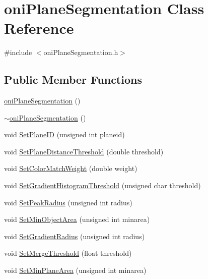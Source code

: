 \hypertarget{classoni_plane_segmentation}{\section{oni\-Plane\-Segmentation Class Reference}
\label{classoni_plane_segmentation}
}


{\ttfamily \#include $<$oni\-Plane\-Segmentation.\-h$>$}

\subsection*{Public Member Functions}
\begin{DoxyCompactItemize}
\item 
\hyperlink{classoni_plane_segmentation_a4ace0243ee63fd42feeb32e67082467c}{oni\-Plane\-Segmentation} ()
\item 
\hyperlink{classoni_plane_segmentation_ad240c925a9d7548b0541a937a3d8323d}{$\sim$oni\-Plane\-Segmentation} ()
\item 
void \hyperlink{classoni_plane_segmentation_aebbb7db20ffabe9ff6af48c428209990}{Set\-Plane\-I\-D} (unsigned int planeid)
\item 
void \hyperlink{classoni_plane_segmentation_ab80b11a24ce72391f854de5c0d79ca43}{Set\-Plane\-Distance\-Threshold} (double threshold)
\item 
void \hyperlink{classoni_plane_segmentation_acbdfa1fd8645deb451fa0474afdc0bac}{Set\-Color\-Match\-Weight} (double weight)
\item 
void \hyperlink{classoni_plane_segmentation_ace19b996d053f44fe8f150972e3981d6}{Set\-Gradient\-Histogram\-Threshold} (unsigned char threshold)
\item 
void \hyperlink{classoni_plane_segmentation_a989b273d62d7dc593c734169792654eb}{Set\-Peak\-Radius} (unsigned int radius)
\item 
void \hyperlink{classoni_plane_segmentation_a8c7df0530ad97691de995d5472754eea}{Set\-Min\-Object\-Area} (unsigned int minarea)
\item 
void \hyperlink{classoni_plane_segmentation_af019daf8981643397c62f3320f7e25a8}{Set\-Gradient\-Radius} (unsigned int radius)
\item 
void \hyperlink{classoni_plane_segmentation_abd5af64008a7f24f2027a127af77c595}{Set\-Merge\-Threshold} (float threshold)
\item 
void \hyperlink{classoni_plane_segmentation_aaf0560f3c9e14c4c82fbde09a5868cae}{Set\-Min\-Plane\-Area} (unsigned int minarea)

\end{DoxyCompactItemize}

